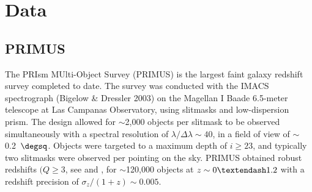 
\section{Data}\label{sec:data}


\subsection{PRIMUS}\label{sec:PRIMUS}
 
The PRIsm MUlti-Object Survey (PRIMUS) is the largest faint galaxy redshift survey completed to date.
The survey was conducted with the IMACS spectrograph (Bigelow \& Dressler 2003) on the Magellan I Baade 6.5-meter telescope at 
Las Campanas 
Observatory, using slitmasks and low-dispersion prism.
The design allowed for $\sim$2,000 objects per slitmask to be observed simultaneously with a spectral resolution of ${\lambda/\Delta
\lambda \sim 40}$, in 
a field of view of $\sim$0.2~$\degsq$.
Objects were targeted to a maximum depth of ${i \ge 23}$, and typically two slitmasks were observed per pointing on the sky.  
PRIMUS obtained robust redshifts $({Q \ge 3}$, see \citet{Coil11} and \citet{Cool13}, for $\sim$120,000 objects at ${z \sim 
0\textendash1.2}$ with a 
redshift precision of ${\sigma_{z}/(1 + z) \sim 0.005}$.

